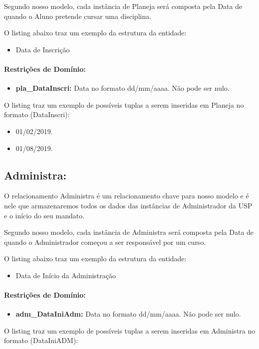 \documentclass{report}
\begin{document}
  Segundo nosso modelo, cada instância de Planeja será composta pela Data de quando o Aluno pretende cursar uma disciplina.
    
  O listing abaixo traz um exemplo da estrutura da entidade:
\begin{itemize}
  \item Data de Inscrição
\end{itemize}
\paragraph{Restrições de Domínio:}
\begin{itemize}
  \item \textbf{pla\_DataInscri:} Data no formato dd/mm/aaaa. Não pode ser nulo.
\end{itemize}
O listing traz um exemplo de possíveis tuplas a serem inseridas em Planeja no formato (DataInscri):

\begin{itemize}
  \item 01/02/2019.
  \item 01/08/2019.
\end{itemize}
\subsection{Administra:}
O relacionamento Administra é um relacionamento chave para nosso modelo e é nele que armazenaremos todos os dados das instâncias de Administrador da USP e o início do seu mandato.
  
  Segundo nosso modelo, cada instância de Administra será composta pela Data de quando o Administrador começou a ser responsável por um curso.
    
  O listing abaixo traz um exemplo da estrutura da entidade:
\begin{itemize}
  \item Data de Início da Administração
\end{itemize}
\paragraph{Restrições de Domínio:}
\begin{itemize}
  \item \textbf{adm\_DataIniAdm:} Data no formato dd/mm/aaaa. Não pode ser nulo.
\end{itemize}
O listing traz um exemplo de possíveis tuplas a serem inseridas em Administra no formato (DataIniADM):
\end{document}
